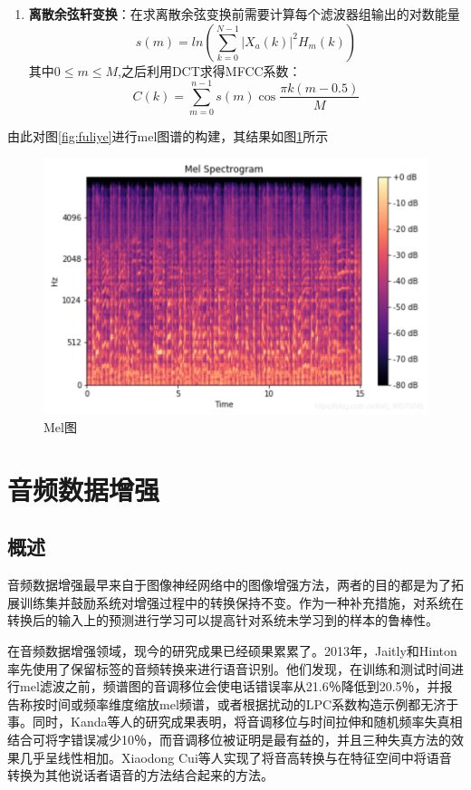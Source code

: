 \begin{enumerate}
    \item \textbf{离散余弦轩变换}：在求离散余弦变换前需要计算每个滤波器组输出的对数能量
    \begin{equation}
        s(m) = ln(\sum_{k=0}^{N-1}|X_a(k)|^2H_m(k))
    \end{equation}
    其中\(0\le m \le M\),之后利用DCT求得MFCC系数：
    \begin{equation}
        C(k) = \sum_{m=0}^{n-1}s(m)\cos{\frac{\pi k(m-0.5)}{M}}
    \end{equation}
\end{enumerate}
由此对图\ref{fig:fuliye}进行mel图谱的构建，其结果如图\ref{fig:Mel}所示
     \begin{figure}[h]
      \centering
      \includegraphics[width=\textwidth]{figures/melPic.png}
      \caption{Mel图}
      \label{fig:Mel}
    \end{figure}
\section{音频数据增强}
\subsection{概述}
音频数据增强最早来自于图像神经网络中的图像增强方法，两者的目的都是为了拓展训练集并鼓励系统对增强过程中的转换保持不变。作为一种补充措施，对系统在转换后的输入上的预测进行学习可以提高针对系统未学习到的样本的鲁棒性。 

在音频数据增强领域，现今的研究成果已经硕果累累了。2013年，Jaitly和Hinton \cite{Jaitly2013VocalTL}率先使用了保留标签的音频转换来进行语音识别。他们发现，在训练和测试时间进行mel滤波之前，频谱图的音调移位会使电话错误率从21.6％降低到20.5％，并报告称按时间或频率维度缩放mel频谱，或者根据扰动的LPC系数构造示例都无济于事。同时，Kanda等人的研究成果\cite{kanda2013elastic}表明，将音调移位与时间拉伸和随机频率失真相结合可将字错误减少10％，而音调移位被证明是最有益的，并且三种失真方法的效果几乎呈线性相加。Xiaodong Cui等人\cite{cui2015data}实现了将音高转换与在特征空间中将语音转换为其他说话者语音的方法结合起来的方法。

